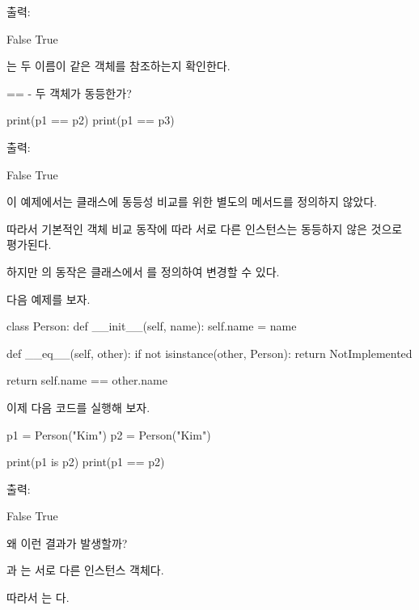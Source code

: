 출력:

\begin{dhkzsh}
False
True
\end{dhkzsh}

는 두 이름이 같은 객체를 참조하는지 확인한다.

\begin{dhknote}
\begin{dhksmry}[centered]
== - 두 객체가 동등한가?
\end{dhksmry}
\end{dhknote}

\begin{dhkcode}
print(p1 == p2)
print(p1 == p3)
\end{dhkcode}

출력:

\begin{dhkzsh}
False
True
\end{dhkzsh}

이 예제에서는  클래스에 동등성 비교를 위한 별도의 메서드를 정의하지 않았다.

따라서 기본적인 객체 비교 동작에 따라 서로 다른 인스턴스는 동등하지 않은 것으로 평가된다.

하지만 \zsh{==}의 동작은 클래스에서 를 정의하여 변경할 수 있다.

다음 예제를 보자.

\begin{dhkcode}
class Person:
    def __init__(self, name):
        self.name = name

    def __eq__(self, other):
        if not isinstance(other, Person):
            return NotImplemented
        
        return self.name == other.name
\end{dhkcode}

이제 다음 코드를 실행해 보자.

\begin{dhkcode}
p1 = Person("Kim")
p2 = Person("Kim")

print(p1 is p2)
print(p1 == p2)
\end{dhkcode}

출력:

\begin{dhkzsh}
False
True
\end{dhkzsh}

왜 이런 결과가 발생할까?

과 는 서로 다른 인스턴스 객체다.

따라서 는 다.

